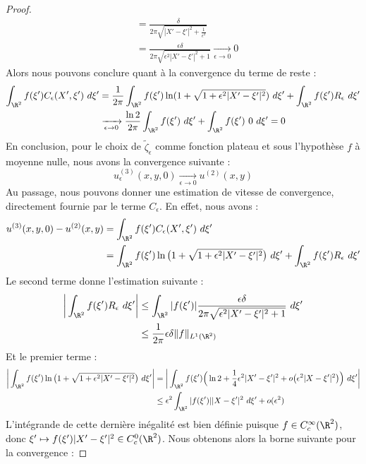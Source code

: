 \begin{proof}
\begin{align*}
    &= \frac{\delta}{2\pi \sqrt{|X' - \xi'|^2 + \frac{1}{\epsilon^2}}} \\
    &= \frac{\epsilon \delta}{2\pi \sqrt{\epsilon^2 |X' - \xi'|^2 + 1}} \xrightarrow[\epsilon \to 0]{} 0
\end{align*}
Alors nous pouvons conclure quant à la convergence du terme de reste :
\begin{align*}
    \int_{\R^2} f(\xi') C_{\epsilon}(X',\xi') \ d\xi' &= \frac{1}{2\pi} \int_{\R^2} f(\xi')\ln(1 + \sqrt{1 + \epsilon^2 |X' - \xi'|^2}) \ d\xi' + \int_{\R^2} f(\xi') R_{\epsilon} \ d\xi' \\
    &\xrightarrow[\epsilon \to 0]{} \frac{\ln 2}{2\pi} \int_{\R^2} f(\xi') \ d\xi' + \int_{\R^2} f(\xi') \ 0 \ d\xi' = 0
\end{align*}
En conclusion, pour le choix de $\tilde{\zeta}_{\epsilon}$ comme fonction plateau et sous l'hypothèse $f$ à moyenne nulle, nous avons la convergence suivante :
$$u_{\epsilon}^{(3)}(x,y,0) \xrightarrow[\epsilon \to 0]{} u^{(2)}(x,y) $$
Au passage, nous pouvons donner une estimation de vitesse de convergence, directement fournie par le terme $C_{\epsilon}$. En effet, nous avons :
\begin{align*}
    u^{(3)}(x,y,0) - u^{(2)}(x,y) &= \int_{\R^2} f(\xi') C_{\epsilon}(X',\xi') \ d\xi' \\
    &= \int_{\R^2} f(\xi') \ln\big(1 + \sqrt{1 + \epsilon^2 |X' - \xi'|^2}\big) \ d\xi' + \int_{\R^2} f(\xi') R_{\epsilon} \ d\xi'
\end{align*}
Le second terme donne l'estimation suivante : 
\begin{align*}
    \bigg| \int_{\R^2} f(\xi') R_{\epsilon} \ d\xi' \bigg| &\leq \int_{\R^2} |f(\xi')| \frac{\epsilon \delta}{2\pi \sqrt{\epsilon^2|X' - \xi'|^2 + 1}} \ d\xi' \\
    &\leq \frac{1}{2\pi} \epsilon \delta \|f\|_{L^1(\R^2)}
\end{align*}
Et le premier terme :
\begin{align*}
    \bigg| \int_{\R^2}  f(\xi') \ln\big(1 + \sqrt{1 + \epsilon^2 |X' - \xi'|^2}\big) \ d\xi' \bigg| &= \bigg| \int_{\R^2} f(\xi') \Big( \ln 2 + \frac{1}{4}\epsilon^2 |X' - \xi'|^2 + o\big(\epsilon^2|X - \xi'|^2\big) \Big) \ d\xi' \bigg| \\
    &\leq \epsilon^2 \int_{\R^2} |f(\xi')| |X - \xi'|^2 \ d\xi' + o(\epsilon^2)
\end{align*}
L'intégrande de cette dernière inégalité est bien définie puisque $f \in C^{\infty}_c(\R^2)$, donc $\xi' \mapsto f(\xi')|X' - \xi'|^2 \in C^0_c(\R^2)$. Nous obtenons alors la borne suivante pour la convergence :

\end{proof}
